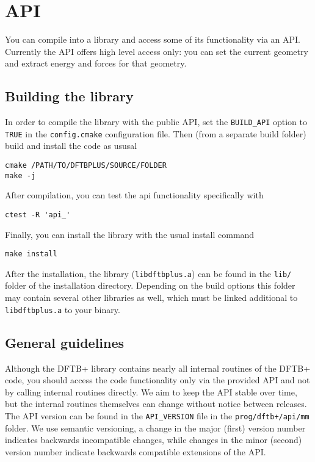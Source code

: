 \chapter{\dftbp{} API}

You can compile \dftbp{} into a library and access some of its functionality via
an API. Currently the API offers high level access only: you can set the current
geometry and extract energy and forces for that geometry.

\section{Building the library}

In order to compile the \dftbp{} library with the public API, set the
\verb|BUILD_API| option to \verb|TRUE| in the \verb|config.cmake| configuration
file. Then (from a separate build folder) build and install the code as ususal
\begin{verbatim}
cmake /PATH/TO/DFTBPLUS/SOURCE/FOLDER
make -j
\end{verbatim}

After compilation, you can test the api functionality specifically with
\begin{verbatim}
ctest -R 'api_'
\end{verbatim}

Finally, you can install the library with the usual install command
\begin{verbatim}
make install
\end{verbatim}

After the installation, the library (\verb|libdftbplus.a|) can be found in the
\verb|lib/| folder of the installation directory. Depending on the build options
this folder may contain several other libraries as well, which must be linked
additional to \verb|libdftbplus.a| to your binary.

\section{General guidelines}

Although the DFTB+ library contains nearly all internal routines of the DFTB+
code, you should access the code functionality only via the provided API and not
by calling internal routines directly. We aim to keep the API stable over time,
but the internal routines themselves can change without notice between
releases. The API version can be found in the \verb|API_VERSION| file in the
\verb|prog/dftb+/api/mm| folder. We use semantic versioning, a change in the
major (first) version number indicates backwards incompatible changes, while
changes in the minor (second) version number indicate backwards compatible
extensions of the API.

